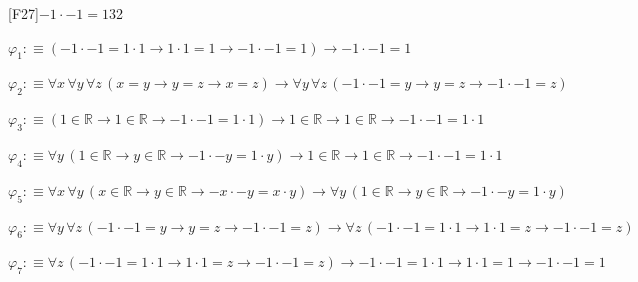 \begin{fullproof}{[F27]}{$-1 \cdot -1 = 1$}{32}
\begin{ptree}
\noLine
{}
\noLine
{}
\end{ptree}
\begin{abbrevlist}
\item $\varphi_{1} :\equiv (-1 \cdot -1 = 1 \cdot 1 \to 1 \cdot 1 = 1 \to -1 \cdot -1 = 1) \to -1 \cdot -1 = 1$
\item $\varphi_{2} :\equiv \forall x\,\forall y\,\forall z\,(x = y \to y = z \to x = z) \to \forall y\,\forall z\,(-1 \cdot -1 = y \to y = z \to -1 \cdot -1 = z)$
\item $\varphi_{3} :\equiv (1 \in \mathbb{R} \to 1 \in \mathbb{R} \to -1 \cdot -1 = 1 \cdot 1) \to 1 \in \mathbb{R} \to 1 \in \mathbb{R} \to -1 \cdot -1 = 1 \cdot 1$
\item $\varphi_{4} :\equiv \forall y\,(1 \in \mathbb{R} \to y \in \mathbb{R} \to -1 \cdot -y = 1 \cdot y) \to 1 \in \mathbb{R} \to 1 \in \mathbb{R} \to -1 \cdot -1 = 1 \cdot 1$
\item $\varphi_{5} :\equiv \forall x\,\forall y\,(x \in \mathbb{R} \to y \in \mathbb{R} \to -x \cdot -y = x \cdot y) \to \forall y\,(1 \in \mathbb{R} \to y \in \mathbb{R} \to -1 \cdot -y = 1 \cdot y)$
\item $\varphi_{6} :\equiv \forall y\,\forall z\,(-1 \cdot -1 = y \to y = z \to -1 \cdot -1 = z) \to \forall z\,(-1 \cdot -1 = 1 \cdot 1 \to 1 \cdot 1 = z \to -1 \cdot -1 = z)$
\item $\varphi_{7} :\equiv \forall z\,(-1 \cdot -1 = 1 \cdot 1 \to 1 \cdot 1 = z \to -1 \cdot -1 = z) \to -1 \cdot -1 = 1 \cdot 1 \to 1 \cdot 1 = 1 \to -1 \cdot -1 = 1$
\end{abbrevlist}
\end{fullproof}
